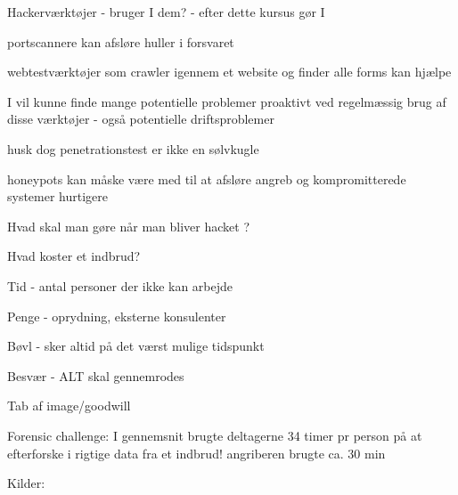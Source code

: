 
\begin{list1}
\item Hackerværktøjer - bruger I dem? - efter dette kursus gør I 
\item portscannere kan afsløre huller i forsvaret
\item webtestværktøjer som crawler igennem et website og finder alle
  forms kan hjælpe
\item I vil kunne finde mange potentielle problemer proaktivt ved
  regelmæssig brug af disse værktøjer - også potentielle driftsproblemer
\item husk dog penetrationstest er ikke en sølvkugle
\item honeypots kan måske være med til at afsløre angreb og
  kompromitterede systemer hurtigere
\end{list1}



\begin{list1}
\item Hvad skal man gøre når man bliver hacket ?
\item Hvad koster et indbrud?
\begin{list2}
\item Tid - antal personer der ikke kan arbejde
\item Penge - oprydning, eksterne konsulenter
\item Bøvl - sker altid på det værst mulige tidspunkt
\item Besvær - ALT skal gennemrodes
\item Tab af image/goodwill
\end{list2}
\item Forensic challenge:
I gennemsnit brugte deltagerne 34 timer pr person på
at efterforske i rigtige data fra et indbrud!
angriberen brugte ca. 30 min
\item Kilder:
\\
\end{list1}


